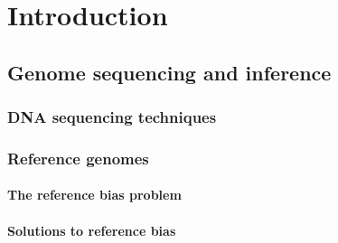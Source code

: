 
\chapter{Introduction}  %

\ifpdf
    \graphicspath{{Chapter1/Figs/Raster/}{Chapter1/Figs/PDF/}{Chapter1/Figs/}}
\else
    \graphicspath{{Chapter1/Figs/Vector/}{Chapter1/Figs/}}
\fi


\section{Genome sequencing and inference}

\subsection{DNA sequencing techniques}

\subsection{}

\subsection{Reference genomes}


\subsubsection{The reference bias problem}


\subsubsection{Solutions to reference bias}


